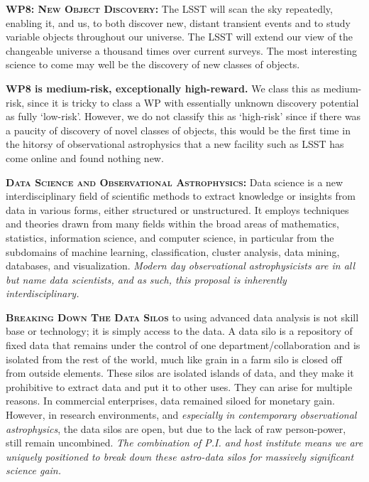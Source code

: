 \smallskip
\smallskip
\noindent
\textbf{\textsc{WP8: New Object Discovery:}} 
The LSST will scan the sky repeatedly, enabling it, and us, to both
discover new, distant transient events and to study variable objects
throughout our universe. The LSST will extend our view of the
changeable universe a thousand times over current surveys.  The most
interesting science to come may well be the discovery of new classes
of objects.

\noindent
{\bf WP8 is medium-risk, exceptionally high-reward.}
We class this as medium-risk, since it is tricky to class a WP with essentially unknown discovery potential as fully `low-risk'. However, we do not classify this as `high-risk' since if there was a paucity of discovery of novel classes of objects, this would be the first time in the hitorsy of observational astrophysics that a new facility such as LSST has come online and found nothing new. 


\smallskip
\smallskip
\noindent
\textbf{\textsc{{Data Science and Observational Astrophysics:}}}
Data science is a new interdisciplinary field of scientific methods to
extract knowledge or insights from data in various forms, either
structured or unstructured. It employs techniques and theories drawn
from many fields within the broad areas of mathematics, statistics,
information science, and computer science, in particular from the
subdomains of machine learning, classification, cluster analysis, data
mining, databases, and visualization.  {\it Modern day observational
astrophysicists are in all but name data scientists, and as such, this
proposal is inherently interdisciplinary.}




\smallskip
\smallskip
\noindent
\textbf{\textsc{Breaking Down The Data Silos}}
to using advanced data analysis is not skill base or technology; it is
simply access to the data.  A data silo is a repository of fixed data
that remains under the control of one department/collaboration and is
isolated from the rest of the world, much like grain in a farm silo is
closed off from outside elements. These silos are isolated islands of
data, and they make it prohibitive to extract data and put it to other
uses. They can arise for multiple reasons. In commercial enterprises,
data remained siloed for monetary gain.  However, in research
environments, and {\it especially in contemporary observational
astrophysics}, the data silos are open, but due to the lack of raw
person-power, still remain uncombined. {\it The combination 
of P.I. and host institute means we are uniquely positioned to 
break down these astro-data silos for massively significant 
science gain.}


